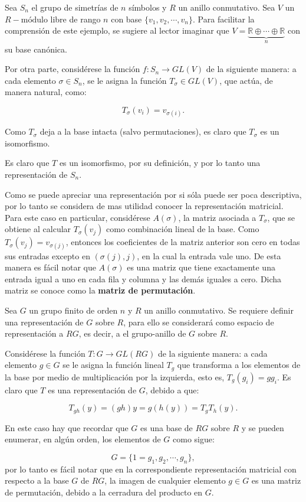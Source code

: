 \begin{ejemplo}
Sea $S_n$ el grupo de simetrías de $n$ símbolos y $R$ un anillo conmutativo. Sea $V$ un $R-\mbox{módulo}$ libre de rango $n$ con base $\{v_1, v_2, \cdots, v_n\}$. Para facilitar la comprensión de este ejemplo, se sugiere al lector imaginar que $V = \underset{n}{\underbrace{\mathds{R} \oplus \cdots \oplus \mathds{R}}}$ con su base canónica. 

Por otra parte, considérese la función $f \colon S_n \to GL(V)$ de la siguiente manera: a cada elemento $\sigma 
\in S_n$, se le asigna la función $T_{\sigma} \in GL(V)$, que actúa, de manera natural, como:

\[ T_{\sigma}(v_i) = v_{\sigma(i)}. \]

Como $T_{\sigma}$ deja a la base intacta (salvo permutaciones), es claro que $T_\sigma$ es un isomorfismo. 

Es claro que $T$ es un isomorfismo, por su definición, y por lo tanto una representación de $S_n$.

Como se puede apreciar una representación por si sóla puede ser poca descriptiva, por lo tanto se considera de mas utilidad conocer la representación matricial. Para este caso en particular, considérese $A(\sigma)$, la matriz asociada a $T_{\sigma}$, que se obtiene al calcular $T_{\sigma}(v_j)$ como combinación lineal de la base. Como $T_{\sigma} (v_j) = v_{\sigma(j)}$, entonces los coeficientes de la matriz anterior son cero en todas sus entradas excepto en $(\sigma(j),j)$, en la cual la entrada vale uno. De esta manera es fácil notar que $A(\sigma)$ es una matriz que tiene exactamente una entrada igual a uno en cada fila y columna y las demás iguales a cero. Dicha matriz se conoce como la \textbf{matriz de permutación}.

\end{ejemplo}

\begin{ejemplo}
Sea $G$ un grupo finito de orden $n$ y $R$ un anillo conmutativo. Se requiere definir una representación de $G$ sobre $R$, para ello se considerará  como espacio de representación a $RG$, es decir, a el grupo-anillo de $G$ sobre $R$. 

Considérese la función $T \colon G \to GL(RG)$ de la siguiente manera: a cada elemento $g \in G$ se le asigna la función lineal $T_g$ que transforma a los elementos de la base por medio de multiplicación por la izquierda, esto es, $T_g(g_i) = gg_i$. Es claro que $T$ es una representación de $G$, debido a que:

\[ T_{gh}(y) = (gh)y = g(h(y)) = T_gT_h(y).  \] 

En este caso hay que recordar que $G$ es una base de $RG$ sobre $R$ y se pueden enumerar, en algún orden, los elementos de $G$ como sigue:

\[ G = \{ 1=g_1, g_2, \cdots, g_n \}, \]  por lo tanto es fácil notar que en la correspondiente representación matricial con respecto a la base $G$ de $RG$, la imagen de cualquier elemento $g \in G$ es una matriz de permutación, debido a la cerradura del producto en $G$. 


\end{ejemplo}


